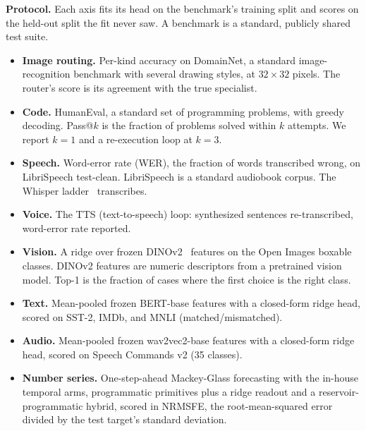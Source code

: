 \documentclass[11pt]{article}
\begin{document}
\textbf{Protocol.} Each axis fits its head on the benchmark's
training split and scores on the held-out split the fit never saw.
A benchmark is a standard, publicly shared test suite.
\begin{itemize}
    \item \textbf{Image routing.} Per-kind accuracy on DomainNet, a
          standard image-recognition benchmark with several drawing styles,
          at $32\times32$ pixels. The router's score is its agreement with
          the true specialist.
    \item \textbf{Code.} HumanEval, a standard set of programming
          problems, with greedy decoding. Pass@$k$ is the fraction of
          problems solved within $k$ attempts. We report $k=1$ and a
          re-execution loop at $k=3$.
    \item \textbf{Speech.} Word-error rate (WER), the fraction of
          words transcribed wrong, on LibriSpeech test-clean. LibriSpeech
          is a standard audiobook corpus. The Whisper
          ladder~\cite{radford2023} transcribes.
    \item \textbf{Voice.} The TTS (text-to-speech) loop: synthesized
          sentences re-transcribed, word-error rate reported.
    \item \textbf{Vision.} A ridge over frozen
          DINOv2~\cite{oquab2024} features on the Open Images boxable
          classes. DINOv2 features are numeric descriptors from a pretrained
          vision model. Top-1 is the fraction of cases where the first
          choice is the right class.
    \item \textbf{Text.} Mean-pooled frozen BERT-base features with a
          closed-form ridge head, scored on SST-2, IMDb, and MNLI
          (matched/mismatched).
    \item \textbf{Audio.} Mean-pooled frozen wav2vec2-base features
          with a closed-form ridge head, scored on Speech Commands v2
          (35 classes).
    \item \textbf{Number series.} One-step-ahead Mackey-Glass
          forecasting with the in-house temporal arms, programmatic
          primitives plus a ridge readout and a reservoir-programmatic
          hybrid, scored in NRMSFE, the root-mean-squared error divided
          by the test target's standard deviation.
\end{itemize}
\end{document}
